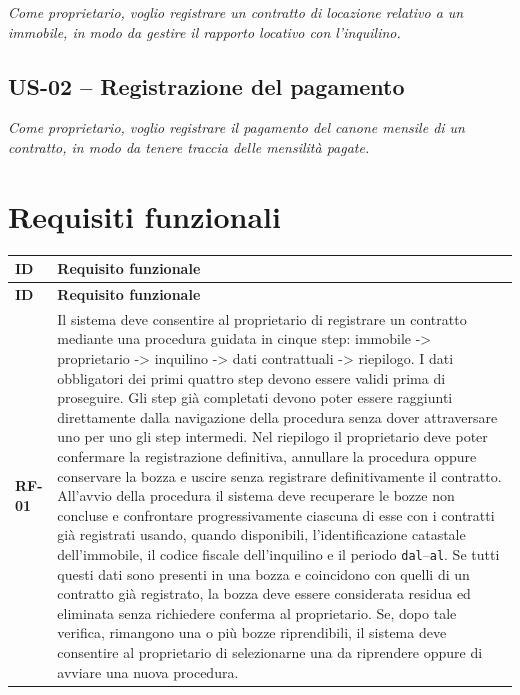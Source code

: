 \documentclass[12pt,a4paper]{article}
\newcommand{\req}[1]{\textbf{#1}}
\begin{document}
\emph{Come proprietario, voglio registrare un contratto di locazione relativo a un immobile,
in modo da gestire il rapporto locativo con l'inquilino.}

\subsection{US-02 -- Registrazione del pagamento}

\emph{Come proprietario, voglio registrare il pagamento del canone mensile di un contratto,
in modo da tenere traccia delle mensilità pagate.}

\section{Requisiti funzionali}

\begin{longtable}{>{\raggedright\arraybackslash}p{1.8cm}
                  >{\raggedright\arraybackslash}p{13cm}}
\toprule
\textbf{ID} & \textbf{Requisito funzionale} \\
\midrule
\endfirsthead

\toprule
\textbf{ID} & \textbf{Requisito funzionale} \\
\midrule
\endhead

\req{RF-01} &
Il sistema deve consentire al proprietario di registrare un contratto mediante una
procedura guidata in cinque step: immobile -> proprietario -> inquilino -> dati contrattuali ->
riepilogo. I dati obbligatori dei primi quattro step devono essere validi prima di proseguire.
Gli step già completati devono poter essere raggiunti direttamente dalla navigazione della
procedura senza dover attraversare uno per uno gli step intermedi. Nel riepilogo il proprietario
deve poter confermare la registrazione definitiva, annullare la procedura oppure conservare la
bozza e uscire senza registrare definitivamente il contratto.
All'avvio della procedura il sistema deve recuperare le bozze non concluse e confrontare
progressivamente ciascuna di esse con i contratti già registrati usando, quando disponibili,
l'identificazione catastale dell'immobile, il codice fiscale dell'inquilino e il periodo
\texttt{dal}--\texttt{al}. Se tutti questi dati sono presenti in una bozza e coincidono con
quelli di un contratto già registrato, la bozza deve essere considerata residua ed eliminata
senza richiedere conferma al proprietario. Se, dopo tale verifica, rimangono una o più bozze
riprendibili, il sistema deve consentire al proprietario di selezionarne una da riprendere
oppure di avviare una nuova procedura. \\


\end{longtable}
\end{document}
